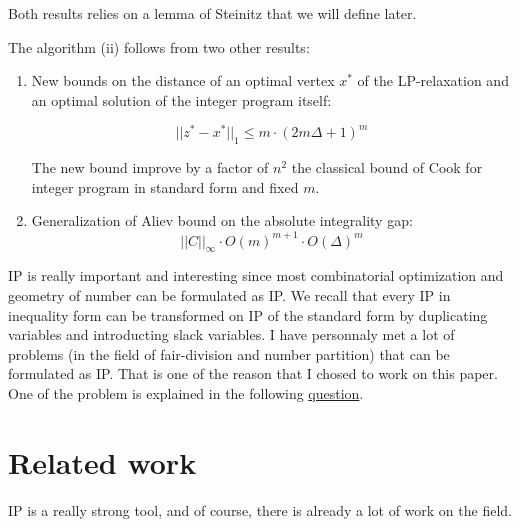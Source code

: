 \documentclass[12pt]{article}
\theoremstyle{definition}
\begin{document}
Both results relies on a lemma of Steinitz that we will define later.  

\newpage

The algorithm (ii) follows from two other results:

\begin{enumerate}[label=(\alph*)]
	\item New bounds on the distance of an optimal vertex $x^*$ of the LP-relaxation and an optimal solution of the integer program itself:
	
	$$
	||z^*-x^*||_1 \leq m \cdot (2 m \Delta +1)^m
	$$
	
	The new bound improve by a factor of $n^2$ the classical bound of Cook for 
	integer program in standard form and fixed $m$.
	
	\item Generalization of Aliev bound on the absolute integrality gap:
	$$
	||C||_{\infty} \cdot O(m)^{m+1} \cdot O(\Delta)^m
	$$

\end{enumerate}

IP is really important and interesting since most combinatorial optimization and geometry of number can be formulated as IP. We recall that every IP in inequality form can be transformed on IP of the standard form by duplicating variables and introducting slack variables. I have personnaly met a lot of problems (in the field of fair-division and number partition) that can be formulated as IP. That is one of the reason that I chosed to work on this paper. One of the problem is explained in the following \href{https://or.stackexchange.com/questions/7062/}{question}. \\


\section{Related work}

IP is a really strong tool, and of course, there is already a lot of work on the field.
\end{document}
